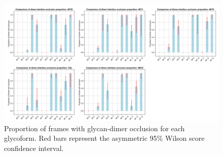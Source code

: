 \documentclass[sn-vancouver]{sn-jnl}
\begin{document}
\renewcommand{\thefigure}{S\arabic{figure}}
\begin{figure}[H]
\centering
\includegraphics[width=1.0\textwidth]{Figures/occlusion_proportion_models_2.png}
\caption{Proportion of frames with glycan-dimer occlusion for each glycoform. Red bars represent the asymmetric 95\% Wilson score confidence interval.}
\label{supple_fig: occlusion_binomial}
\end{figure}


\end{document}
